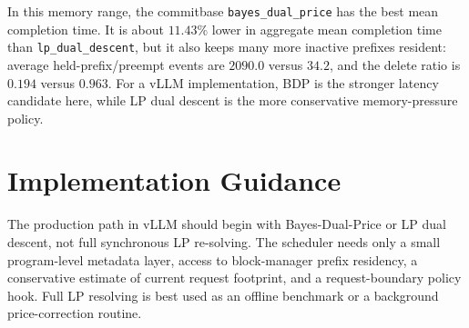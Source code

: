 \documentclass[11pt]{article}
\begin{document}
In this memory range, the commitbase \texttt{bayes\_dual\_price} has the best
mean completion time.  It is about $11.43\%$ lower in aggregate mean completion
time than \texttt{lp\_dual\_descent}, but it also keeps many more inactive
prefixes resident: average held-prefix/preempt events are $2090.0$ versus
$34.2$, and the delete ratio is $0.194$ versus $0.963$.  For a vLLM
implementation, BDP is the stronger latency candidate here, while LP dual
descent is the more conservative memory-pressure policy.

\section{Implementation Guidance}

The production path in vLLM should begin with Bayes-Dual-Price or LP dual
descent, not full synchronous LP re-solving.  The scheduler needs only a small
program-level metadata layer, access to block-manager prefix residency, a
conservative estimate of current request footprint, and a request-boundary
policy hook.  Full LP resolving is best used as an offline benchmark or a
background price-correction routine.
\end{document}
